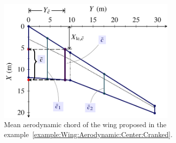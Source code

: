 \documentclass[[12pt,twoside]{book}
\begin{document}
%

%
\begin{figure}[t]%
    \includegraphics[width=0.78\textwidth]{Chapter_2/aerodynamic_center_of_a_cranked_wing/wing_ac_cranked_1_drawing_mac.pdf}
  \caption{
         Mean aerodynamic chord of the wing proposed in the example~\ref{example:Wing:Aerodynamic:Center:Cranked}.
  }
  \label{fig:Wing:Aerodynamic:Center:Cranked:MAC}%
\end{figure}
%
\end{document}

